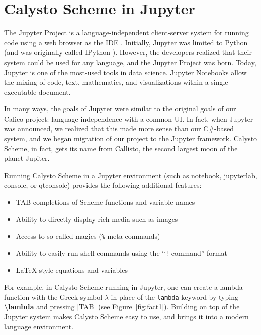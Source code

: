 \documentclass[acmsmall,screen,nonacm]{acmart}
\begin{document}

\section{Calysto Scheme in Jupyter}

The Jupyter Project is a language-independent client-server system for
running code using a web browser as the IDE
\cite{Kluyver2016jupyter}. Initially, Jupyter was limited to Python
(and was originally called IPython \cite{PER-GRA:2007}). However, the
developers realized that their system could be used for any language,
and the Jupyter Project was born. Today, Jupyter is one of the
most-used tools in data science. Jupyter Notebooks allow the mixing of
code, text, mathematics, and visualizations within a single executable
document.

In many ways, the goals of Jupyter were similar to the original goals of our
Calico project: language independence with a common UI. In fact, when Jupyter
was announced, we realized that this made more sense than our C\#-based system,
and we began migration of our project to the Jupyter framework. Calysto Scheme,
in fact, gets its name from Callisto, the second largest moon of the planet
Jupiter.

Running Calysto Scheme in a Jupyter environment (such as notebook, jupyterlab,
console, or qtconsole) provides the following additional features:

\begin{itemize}
\item TAB completions of Scheme functions and variable names
\item Ability to directly display rich media such as images
\item Access to so-called magics (\texttt{\%} meta-commands)
\item Ability to easily run shell commands using the ``\texttt{!} command'' format
\item \LaTeX-style equations and variables
\end{itemize}

For example, in Calysto Scheme running in Jupyter, one can create a lambda
function with the Greek symbol $\lambda$ in place of the \texttt{lambda}
keyword by typing \textbf{\textbackslash lambda} and pressing [TAB] (see
Figure~\ref{fig:fact1}). Building on top of the Jupyter system makes Calysto
Scheme easy to use, and brings it into a modern language environment.
\end{document}
